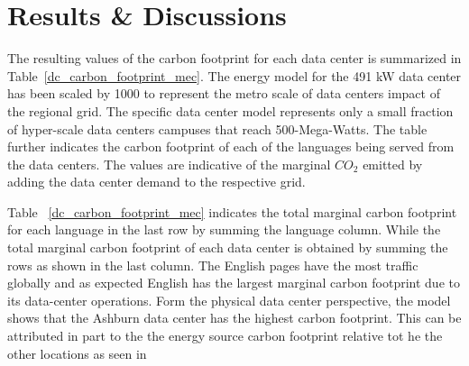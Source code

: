 \section{Results \& Discussions}
The resulting values of the carbon footprint for each data center is summarized in Table~\ref{dc_carbon_footprint_mec}. The energy model for the 491 kW data center has been scaled by 1000 to represent the metro scale of data centers impact of the regional grid. The specific data center model represents only a small fraction of hyper-scale data centers campuses that reach 500-Mega-Watts. The table further indicates the carbon footprint of each of the languages being served from the data centers. The values are indicative of the marginal $CO_{2}$ emitted by adding the data center demand to the respective grid.

 


Table~ \ref{dc_carbon_footprint_mec} indicates the total marginal carbon footprint for each language in the last row by summing the language column. While the total marginal carbon footprint of each data center is obtained by summing the rows as shown in the last column. The English pages have the most traffic globally and as expected English has the largest marginal carbon footprint due to its data-center operations. Form the physical data center perspective, the model shows that the Ashburn data center has the highest carbon footprint. This can be attributed in part to the the energy source carbon footprint relative tot he the other locations as seen in  




